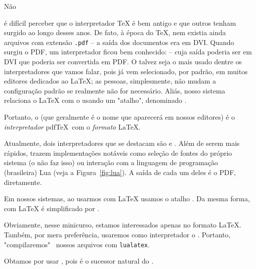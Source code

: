 Não
é difícil perceber que o interpretador \TeX{} é bem antigo e que outros tenham
surgido ao longo desses anos.
De fato, à época do \TeX, nem existia ainda arquivos com extensão  \texttt{.pdf} 
-- a saída dos documentos era em DVI.
Quando surgiu o PDF, um interpretador ficou bem conhecido:  -- cuja 
saída poderia ser em DVI que poderia ser convertida em PDF. 
O  talvez seja o mais usado dentre os interpretadores que vamos 
falar, pois já vem selecionado, por padrão, em muitos editores dedicados ao 
\LaTeX {}; 
as pessoas, simplesmente, não mudam a configuração padrão se realmente não 
for necessário.
Aliás, nosso sistema relaciona o \LaTeX{} com o  usando um "atalho", 
denominado .

Portanto, o  (que geralmente é o nome que aparecerá em nossos 
editores) é o \textit{interpretador} pdf\TeX\ com o \textit{formato} \LaTeX. 

Atualmente, dois interpretadores que se destacam são  e .
Além de serem mais rápidos, trazem implementações notáveis como seleção de fontes 
do próprio sistema (o  não faz isso) ou interação com a linguagem 
de programação (brasileira) Lua (veja a Figura~\ref{fig:lua}). 
A saída de cada um deles é o PDF, diretamente.

Em nossos sistemas, ao usarmos  com \LaTeX{} usamos o atalho 
.
Da mesma forma,  com \LaTeX{} é simplificado por .

Obviamente, nesse minicurso, estamos interessados apenas no formato \LaTeX.
Também, por mera preferência, usaremos como interpretador o .
Portanto, "compilaremos" \, nossos arquivos com \texttt{lualatex}.

Obtamos por usar \lualatex, pois é o sucessor natural do \pdflatex. 

